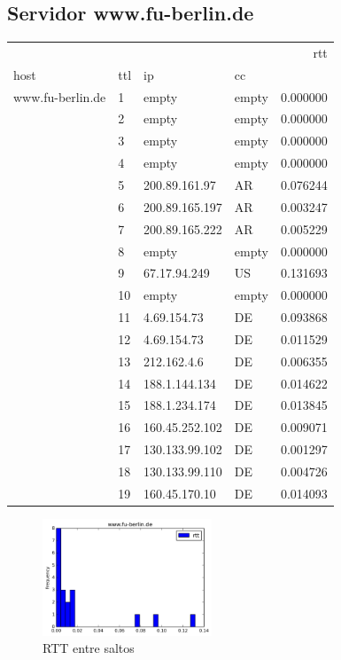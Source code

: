 \subsection{Servidor www.fu-berlin.de}
\begin{center}
\begin{tabular}{llllr}
\toprule
                 &    &                &    &       rtt \\
host & ttl & ip & cc &           \\
\midrule
www.fu-berlin.de & 1  & empty & empty &  0.000000 \\
                 & 2  & empty & empty &  0.000000 \\
                 & 3  & empty & empty &  0.000000 \\
                 & 4  & empty & empty &  0.000000 \\
                 & 5  & 200.89.161.97 & AR &  0.076244 \\
                 & 6  & 200.89.165.197 & AR &  0.003247 \\
                 & 7  & 200.89.165.222 & AR &  0.005229 \\
                 & 8  & empty & empty &  0.000000 \\
                 & 9  & 67.17.94.249 & US &  0.131693 \\
                 & 10 & empty & empty &  0.000000 \\
                 & 11 & 4.69.154.73 & DE &  0.093868 \\
                 & 12 & 4.69.154.73 & DE &  0.011529 \\
                 & 13 & 212.162.4.6 & DE &  0.006355 \\
                 & 14 & 188.1.144.134 & DE &  0.014622 \\
                 & 15 & 188.1.234.174 & DE &  0.013845 \\
                 & 16 & 160.45.252.102 & DE &  0.009071 \\
                 & 17 & 130.133.99.102 & DE &  0.001297 \\
                 & 18 & 130.133.99.110 & DE&  0.004726 \\
                 & 19 & 160.45.170.10 & DE &  0.014093 \\
\bottomrule
\end{tabular}

\end{center}
\begin{figure}[H]
  \centering
    \includegraphics[width=0.45\textwidth]{histogramas_rtt/www-fu-berlin-de.png}
  \caption{RTT entre saltos}
  \label{entropia-s}
\end{figure}

